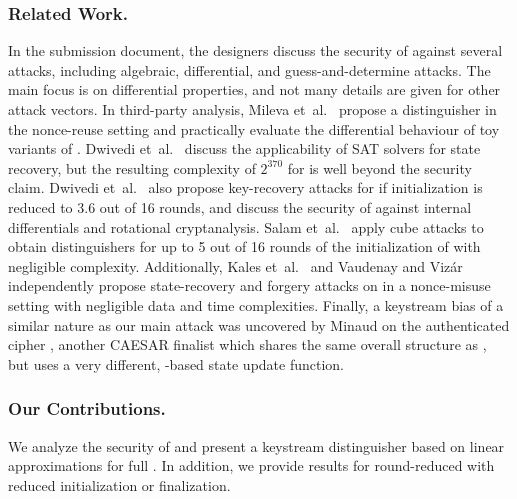 \subsubsection*{Related Work.}
In the \MORUS submission document, the designers discuss the security of \MORUS against
several attacks, including algebraic, differential, and guess-and-determine attacks.
The main focus is on differential properties, and not many details are given for other attack vectors.
In third-party analysis,
Mileva et~al.~\cite{balkancryptsecMilevaDV15} propose a distinguisher in the nonce-reuse setting and practically evaluate the differential behaviour of toy variants of \MORUS.
Dwivedi et~al.~\cite{cryptoeprint:2016:1053} discuss the applicability of SAT solvers for state recovery, but the resulting complexity of $2^{370}$ for \MORUS[640] is well beyond the security claim.
Dwivedi et~al.~\cite{secryptDwivediMW17} also propose key-recovery attacks for \MORUS[1280] if initialization is reduced to 3.6 out of 16 rounds, and discuss the security of \MORUS against internal differentials and rotational cryptanalysis.
Salam et~al.~\cite{trustcomSalamSBDPW17} apply cube attacks to obtain distinguishers for up to 5 out of 16 rounds of the initialization of \MORUS[1280] with negligible complexity.
Additionally, 
Kales et~al.~\cite{cryptoeprint:2017:1137} and
Vaudenay and Viz\'{a}r \cite{cryptoeprint:2017:1147}
independently propose state-recovery and forgery attacks on \MORUS in a nonce-misuse setting with negligible data and time complexities.
Finally, a keystream bias of a similar nature as our main attack was uncovered by Minaud \cite{sacryptMinaud14} on the authenticated cipher  \cite{AEGIS,sacryptWuP13}, another CAESAR finalist which shares the same overall structure as \MORUS, but uses a very different, -based state update function.

\subsubsection*{Our Contributions.}
We analyze the security of \MORUS and present a key\-stream distinguisher based on
linear approximations for full \MORUS[1280].
In addition, we provide results for round-reduced \MORUS with reduced initialization or finalization.

